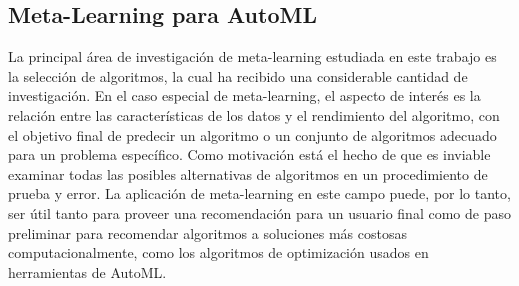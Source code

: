 \documentclass[a4paper,10pt,twocolumn]{article}
\begin{document}

	\subsection{Meta-Learning para AutoML}\label{sub:metalearning-automl}

La principal área de investigación de meta-learning estudiada en este trabajo es la selección de algoritmos, la cual ha recibido una considerable cantidad de investigación. En el caso especial de meta-learning, el aspecto de interés es la relación entre las características de los datos y el rendimiento del algoritmo, con el objetivo final de predecir un algoritmo o un conjunto de algoritmos adecuado para un problema específico. Como motivación está el hecho de que es inviable examinar todas las posibles alternativas de algoritmos en un procedimiento de prueba y error. La aplicación de meta-learning en este campo puede, por lo tanto, ser útil tanto para proveer una recomendación para un usuario final como de paso preliminar para recomendar algoritmos a soluciones más costosas computacionalmente, como los algoritmos de optimización usados en herramientas de AutoML. 
\end{document}

